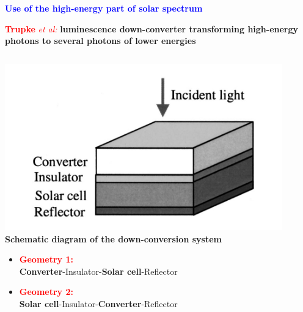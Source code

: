 \documentclass{beamer}
\begin{document}
\begin{frame}%

\begin{center}
 \textcolor{blue}{\textbf{Use of the high-energy part of solar spectrum}}
\end{center}

\begin{center}
\textbf{\textcolor{red}{Trupke}} \textit{\textcolor{red}{et al:}} \textbf{luminescence down-converter transforming high-energy photons to several photons of lower energies}
\end{center} 
 \vspace{-0.2cm}
 \begin{columns}

\begin{column}{0.45\textwidth}
 \begin{center}

  \includegraphics[width=0.9\textwidth]{figures/figure7_down-converter.jpeg} \\
\tiny \textbf{Schematic diagram of the down-conversion system}
\begin{itemize}
 \item \textcolor{red}{\textbf{Geometry 1:}}\\ \textbf{Converter}-Insulator-\textbf{Solar cell}-Reflector
 \item \textcolor{red}{\textbf{Geometry 2:}}\\ \textbf{Solar cell}-Insulator-\textbf{Converter}-Reflector
\end{itemize}

  
  \vspace{2cm}
  
  \end{center}
\end{column}


\end{columns}
\end{frame}
\end{document}
